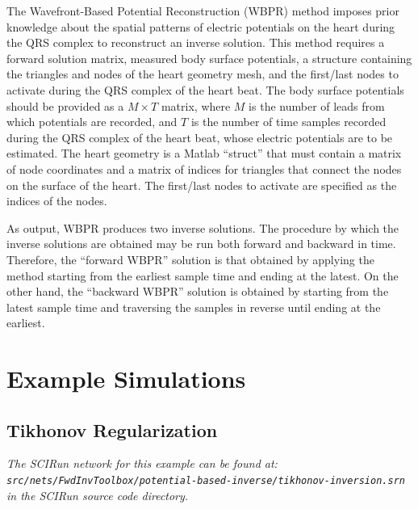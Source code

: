 \documentclass[fleqn,11pt,openany]{book}
\begin{document}
The Wavefront-Based Potential Reconstruction (WBPR) method imposes prior knowledge about the spatial patterns of electric potentials on the heart during the QRS complex to reconstruct an inverse solution. This method requires a forward solution matrix, measured body surface potentials, a structure containing the triangles and nodes of the heart geometry mesh, and the first/last nodes to activate during the QRS complex of the heart beat. The body surface potentials should be provided as a $M \times T$ matrix, where $M$ is the number of leads from which potentials are recorded, and $T$ is the number of time samples recorded during the QRS complex of the heart beat, whose electric potentials are to be estimated. The heart geometry is a Matlab ``struct'' that must contain a matrix of node coordinates and a matrix of indices for triangles that connect the nodes on the surface of the heart. The first/last nodes to activate are specified as the indices of the nodes.

As output, WBPR produces two inverse solutions. The procedure by which the inverse solutions are obtained may be run both forward and backward in time. Therefore, the ``forward WBPR'' solution is that obtained by applying the method starting from the earliest sample time and ending at the latest. On the other hand, the ``backward WBPR'' solution is obtained by starting from the latest sample time and traversing the samples in reverse until ending at the earliest.


\section{Example Simulations}

\subsection{Tikhonov Regularization}

\vspace{5pt}\textit{The SCIRun network for this example can be found at:\\{\tt src/nets/FwdInvToolbox/potential-based-inverse/tikhonov-inversion.srn}\\in the SCIRun source code directory.}\vspace{5pt}
\end{document}

